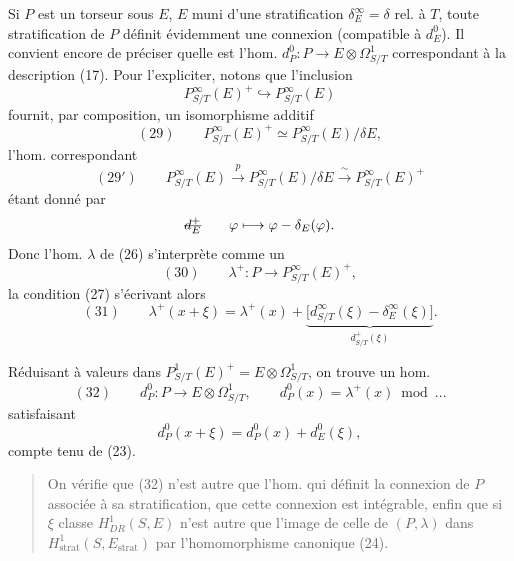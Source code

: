 \documentclass[11pt,a4paper]{article}
\begin{document}
Si $P$ est un torseur sous $E$, $E$ muni d'une
stratification $\delta^\infty_E = \delta$ rel. à $T$, \struck{\ill{}} toute stratification de $P$
 définit évidemment une connexion (compatible à $d^0_E$).
Il convient encore de préciser quelle est l'hom.
$d^0_P : P \to E \otimes \Omega^1_{S/T}$ correspondant à la description (17).
Pour l'expliciter, notons que l'inclusion
\[
P^\infty_{S/T}(E)^+ \hookrightarrow P^\infty_{S/T}(E)
\]
fournit, par composition, un isomorphisme additif
\[
(29)\qquad P^\infty_{S/T}(E)^+ \simeq P^\infty_{S/T}(E)/\delta E ,
\]
l'hom. correspondant
\[
(29')\qquad P^\infty_{S/T}(E) \xrightarrow{\ p\ } P^\infty_{S/T}(E)/\delta E \xrightarrow{\ \sim\ } P^\infty_{S/T}(E)^+
\]
étant donné par
\[
\text{\struck{$d^+_E$}}\qquad \varphi \longmapsto \varphi - \delta_E(\varphi) .
\]
Donc l'hom. $\lambda$ de (26) s'interprète comme un
\[
(30)\qquad \lambda^+ : P \longrightarrow P^\infty_{S/T}(E)^+ ,
\]
 la condition (27) s'écrivant alors
\[
(31)\qquad \lambda^+(x + \xi) = \lambda^+(x) + \underbrace{\bigl[d^\infty_{S/T}(\xi) - \delta^\infty_E(\xi)\bigr]}_{d^+_{S/T}(\xi)} .
\]

Réduisant à valeurs dans $P^1_{S/T}(E)^+ = E \otimes \Omega^1_{S/T}$, on
trouve un hom.
\[
(32)\qquad d^0_P : P \longrightarrow E \otimes \Omega^1_{S/T} , \qquad d^0_P(x) = \lambda^+(x) \bmod \ldots
\]
satisfaisant
\[
d^0_P(x + \xi) = d^0_P(x) + d^0_E(\xi) ,
\]
compte tenu de (23).

\begin{quote}
On vérifie que (32) n'est autre que l'hom.
qui définit la connexion de $P$ associée à sa stratification, \struck{\ill{}} que cette connexion est intégrable, enfin que
si $\xi$ classe  $H^1_{DR}(S,E)$ n'est autre que
l'image de celle de \struck{\ill{}} $(P,\lambda)$ dans $H^1_{\mathrm{strat}}(S,E_{\mathrm{strat}})$
par l'homomorphisme canonique (24).
\end{quote}
\end{document}
